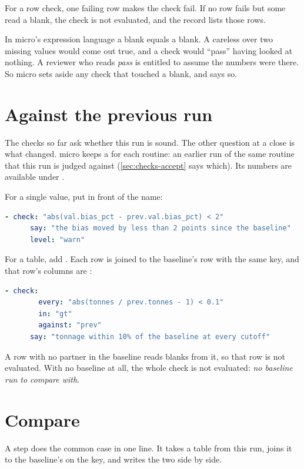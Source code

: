 For a row check, one failing row makes the check fail. If no row fails but some read a blank, the check is not evaluated, and the record lists those rows.

\begin{why}
In micro's expression language a blank equals a blank. A careless  over two missing values would come out true, and a check would ``pass'' having looked at nothing. A reviewer who reads \emph{pass} is entitled to assume the numbers were there. So micro sets aside any check that touched a blank, and says so.
\end{why}

\section{Against the previous run}\label{sec:checks-prev}
The checks so far ask whether this run is sound. The other question at a close is what changed. micro keeps a  for each routine: an earlier run of the same routine that this run is judged against (\cref{sec:checks-accept} says which). Its numbers are available under .

For a single value, put  in front of the name:

\begin{lstlisting}[language=yaml]
    - check: "abs(val.bias_pct - prev.val.bias_pct) < 2"
      say: "the bias moved by less than 2 points since the baseline"
      level: "warn"
\end{lstlisting}

For a table, add . Each row is joined to the baseline's row with the same key, and that row's columns are :

\begin{lstlisting}[language=yaml]
    - check:
        every: "abs(tonnes / prev.tonnes - 1) < 0.1"
        in: "gt"
        against: "prev"
      say: "tonnage within 10% of the baseline at every cutoff"
\end{lstlisting}

A row with no partner in the baseline reads blanks from it, so that row is not evaluated. With no baseline at all, the whole check is not evaluated: \emph{no baseline run to compare with}.

\section{Compare}\label{sec:checks-compare}
A  step does the common case in one line. It takes a table from this run, joins it to the baseline's on the key, and writes the two side by side.

